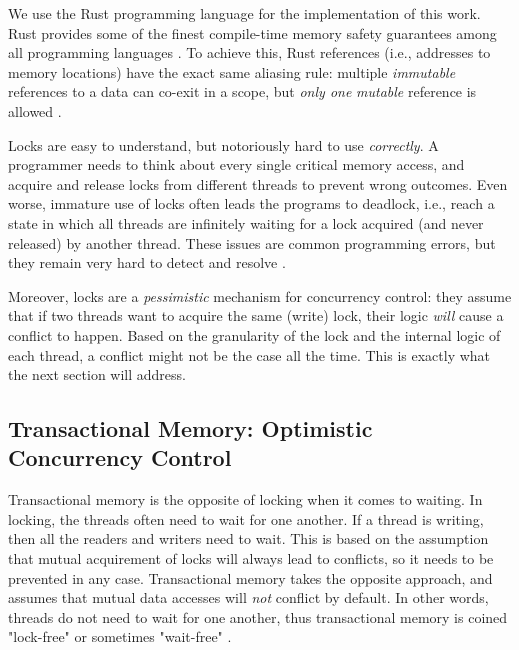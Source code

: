 \begin{remark}
	We use the Rust programming language for the implementation of this work. Rust provides some of
	the finest compile-time memory safety guarantees among all programming languages
	\cite{jungRustBeltSecuringFoundations2017}. To achieve this, Rust references (i.e., addresses to
	memory locations) have the exact same aliasing rule: multiple \textit{immutable} references to a
	data can co-exit in a scope, but \textit{only one} \textit{mutable} reference is allowed
	\cite{weissOxideEssenceRust2020}.
\end{remark}

Locks are easy to understand, but notoriously hard to use \textit{correctly}. A programmer needs to
think about every single critical memory access, and acquire and release locks from different
threads to prevent wrong outcomes. Even worse, immature use of locks often leads the programs to
deadlock, i.e., reach a  state in which all threads are infinitely waiting for a lock acquired (and
never released) by another thread. These issues are common programming errors, but they remain very
hard to detect and resolve \cite{herlihyArtMultiprocessorProgramming2012}.

Moreover, locks are a \textit{pessimistic} mechanism for concurrency control: they assume that if
two threads want to acquire the same (write) lock, their logic \textit{will} cause a conflict to
happen. Based on the granularity of the lock and the internal logic of each thread, a conflict might
not be the case all the time. This is exactly what the next section will address.

\subsection{Transactional Memory: Optimistic Concurrency Control} \label{chap_bg:subsec:stm}

Transactional memory is the opposite of locking when it comes to waiting. In locking, the threads
often need to wait for one another. If a thread is writing, then all the readers and writers need to
wait. This is based on the assumption that mutual acquirement of locks will always lead to
conflicts, so it needs to be prevented in any case. Transactional memory takes the opposite
approach, and assumes that mutual data accesses will \textit{not} conflict by default. In other
words, threads do not need to wait for one another, thus transactional memory is coined "lock-free"
or sometimes "wait-free" \cite{knightArchitectureMostlyFunctional1986}.

